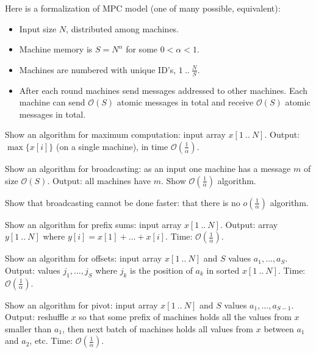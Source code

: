 \documentclass[12pt]{uebung}
\begin{document}
 
\newcommand{\bigo}{\mathcal{O}}
\renewcommand{\aufgname}{Exercise}


Here is a formalization of MPC model (one of many possible, equivalent):

\begin{itemize}
\item Input size $N$, distributed among machines.
\item Machine memory is $S = N^{\alpha}$ for some $0 < \alpha < 1$.
\item Machines are numbered with unique ID's, $1\ ..\ \frac{N}{S}$.
\item After each round machines send messages addressed to other machines. Each machine can send $\bigo(S)$ atomic messages  in total and receive $\bigo(S)$ atomic messages in total.
\end{itemize}

\begin{aufg}
Show an algorithm for maximum computation: input array $x[1\ ..\ N]$. Output: $\max\{x[i]\}$ (on a single machine), in time $\bigo(\frac{1}{\alpha})$.
\end{aufg}

\begin{aufg}
Show an algorithm for broadcasting: as an input one machine has a message $m$ of size $\bigo(S)$. Output: all machines have $m$. Show $\bigo(\frac{1}{\alpha})$ algorithm.
\end{aufg}

\begin{aufg}
Show that broadcasting cannot be done faster: that there is no $o(\frac{1}{\alpha})$ algorithm.
\end{aufg}

\begin{aufg}
Show an algorithm for prefix sums:  input array $x[1\ ..\ N]$. Output: array $y[1\ ..\ N]$ where $y[i] = x[1]+\ldots+x[i]$. Time: $\bigo(\frac{1}{\alpha})$.
\end{aufg}

\begin{aufg}
Show an algorithm for offsets: input array $x[1\ ..\ N]$ and $S$ values $a_1,\ldots,a_S$. Output: values $j_1,\ldots,j_S$ where $j_k$ is the position of $a_k$ in sorted $x[1\ ..\ N]$. Time: $\bigo(\frac{1}{\alpha})$.
\end{aufg}

\begin{aufg}
Show an algorithm for pivot: input array $x[1\ ..\ N]$ and $S$ values $a_1,\ldots,a_{S-1}$. Output: reshuffle $x$ so that some prefix of machines holds all the values from $x$ smaller than $a_1$, then next batch of machines holds all values from $x$ between $a_1$ and $a_2$, etc. Time: $\bigo(\frac{1}{\alpha})$.
\end{aufg}
\end{document}

